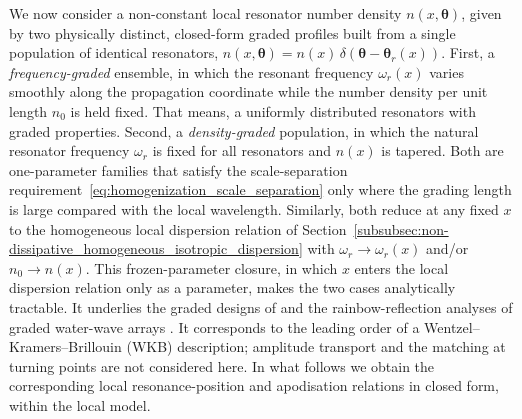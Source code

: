 We now consider a non-constant local resonator number density $n(x,\boldsymbol{\theta})$, given by two physically distinct, closed-form graded profiles built from a single population of identical resonators, $n(x,\boldsymbol{\theta})=n(x)\,\delta(\boldsymbol{\theta}-\boldsymbol{\theta}_r(x))$. First, a \emph{frequency-graded} ensemble, in which the resonant frequency $\omega_r(x)$ varies smoothly along the propagation coordinate while the number density per unit length $n_0$ is held fixed. That means, a uniformly distributed resonators with graded properties. Second, a \emph{density-graded} population, in which the natural resonator frequency $\omega_r$ is fixed for all resonators and $n(x)$ is tapered. Both are one-parameter families that satisfy the scale-separation requirement~\eqref{eq:homogenization_scale_separation} only where the grading length is large compared with the local wavelength. Similarly, both reduce at any fixed $x$ to the homogeneous local dispersion relation of Section~\ref{subsubsec:non-dissipative_homogeneous_isotropic_dispersion} with $\omega_r\to\omega_r(x)$ and/or $n_0\to n(x)$. This frozen-parameter closure, in which $x$ enters the local dispersion relation only as a parameter, makes the two cases analytically tractable. It underlies the graded designs of \cite{liu2025metaplate,jin2026low} and the rainbow-reflection analyses of graded water-wave arrays \cite{bennetts2018graded,wilks2022rainbow}. It corresponds to the leading order of a Wentzel--Kramers--Brillouin (WKB) description; amplitude transport and the matching at turning points are not considered here. In what follows we obtain the corresponding local resonance-position and apodisation relations in closed form, within the local model.


